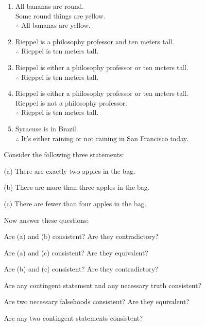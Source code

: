 \begin{enumerate}
\item All bananas are round. \\ Some round things are yellow. \\ $\therefore$ All bananas are yellow.

\item Rieppel is a philosophy professor and ten meters tall. \\ $\therefore$ Rieppel is ten meters tall.

\item Rieppel is either a philosophy professor or ten meters tall. \\ $\therefore$ Rieppel is ten meters tall.

\item Rieppel is either a philosophy professor or ten meters tall.  \\ Rieppel is not a philosophy professor. \\ $\therefore$ Rieppel is ten meters tall.

\item Syracuse is in Brazil. \\ $\therefore$ It's either raining or not raining in San Francisco today. 
\end{enumerate}

\problempart Consider the following three statements:

\begin{earg}
\item[(a)] There are exactly two apples in the bag.
\item[(b)] There are more than three apples in the bag.
\item[(c)] There are fewer than four apples in the bag.
\end{earg}

Now answer these questions:

\begin{earg}
\item Are (a) and (b) consistent?  Are they contradictory? 
\item Are (a) and (c) consistent?  Are they equivalent?
\item Are (b) and (c) consistent?  Are they contradictory? 
\item Are any contingent statement and any necessary truth consistent?  
\item Are two necessary falsehoods consistent?  Are they equivalent?
\item Are any two contingent statements consistent?
\end{earg}

